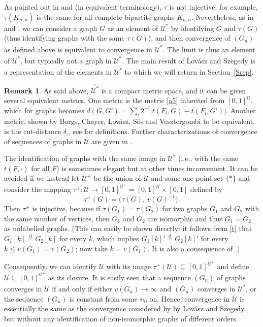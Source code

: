 \documentclass[11pt,reqno,tbtags]{amsart}
\numberwithin{equation}{section}
\theoremstyle{definition}
\newtheorem{remark}{Remark}[section]
\theoremstyle{remark}
\newcommand{\refS}[1]{Section~\ref{#1}}
\newcommand\set[1]{\ensuremath{\{#1\}}}
\newcommand\bigpar[1]{\bigl(#1\bigr)}
\newcommand\ie{i.e.\spacefactor=1000}
\newcommand\eqd{\overset{\mathrm{d}}{=}}
\newcommand\gd{\delta}
\newcommand\cU{{\mathcal U}}
\newcommand\qw{^{-1}}
\renewcommand{\=}{:=}
\newcommand\oi{[0,1]}
\newcommand{\Lovaszetal}{Lov\'asz and Szegedy}
\newcommand{\Borgsetal}{Borgs, Chayes, Lov\'asz, S\'os and Vesztergombi}
\newcommand{\cux}{\cU^*}
\newcommand{\cuxq}{\overline{\cux}}
\newcommand{\cuq}{\overline{\cU}}
\newcommand{\cuu}{\cU^+}
\newcommand{\oiu}{\oi^{\cU}}
\newcommand{\oiuu}{\oi^{\cuu}}
\newcommand{\tauu}{\tau^+}
\newcommand{\dcut}{\gd_\square}
\begin{document}
As pointed out in \cite{LSz} and \cite{BCL1} (in equivalent terminology),
$\tau$ is not injective; for example, $\tau(K_{n,n})$ is the same for
all complete bipartite graphs $K_{n,n}$. 
Nevertheless,
as in \cite{LSz} and \cite{BCL1}, we can
consider a graph $G$ as an element of $\cux$ by identifying $G$ and
$\tau(G)$ (thus identifying graphs with the same $\tau(G)$), and then
convergence of $(G_n)$ as defined above is equivalent to convergence
in $\cuxq$. The limit is thus an element of $\cuxq$, but typically not
a graph in $\cux$.
The main result of \Lovaszetal{} \cite{LSz} is a representation of
the elements in $\cuxq$ to which we will return in \refS{Srep}.

\begin{remark}\label{Rmetric1}
  As said above, $\cuxq$ is a compact metric space, and it can be
  given several equivalent metrics.
One metric is the metric \eqref{a5} inherited from $\oiu$, which for 
graphs becomes 
$d(G,G')=\sum_i 2^{-i}|t(F_i,G)-t(F_i,G')|$.
Another metric, shown by
\Borgsetal{} \cite{BCL1} to be equivalent, 
is the cut-distance $\dcut$, see 
\cite{BCL1} for definitions.
Further characterizations of convergence of sequences of graphs in
  $\cuq$ are given in \citet{BCL1,BCL1ii}. 
\end{remark}

The identification of graphs with the same image in $\cux$
(\ie, with the same $t(F,\cdot)$ for all $F$) is sometimes elegant but
at other times inconvenient. It can be avoided if we instead let
$\cuu$ be the union of $\cU$ and some one-point set \set{*} and
consider the mapping $\tauu:\cU\to\oiuu=\oiu\times\oi$ defined by
\begin{equation}\label{tau+}
  \tauu(G)=\bigpar{\tau(G),\,v(G)\qw}.
\end{equation}
Then $\tauu$ is injective, because if $\tau(G_1)=\tau(G_2)$ for two
graphs $G_1$ and $G_2$ with the same number of vertices, then $G_1$
and $G_2$ are isomorphic and thus $G_1=G_2$ as unlabelled graphs.
(This can easily be shown directly: it follows from \eqref{t} that
$G_1[k]\eqd G_2[k]$ for every $k$, which implies $G_1[k]'\eqd G_2[k]'$
for every $k\le v(G_1)=v(G_2)$; now take $k=v(G_1)$.
It is also a consequence of
\cite[Theorem 2.7 and Theorem 2.3 or Lemma 5.1]{BCL1}.)

Consequently, we can identify $\cU$ with its image $\tauu(\cU)\subseteq\oiuu$
and define $\cuq\subseteq\oiuu$ as its closure.
It is easily seen that a sequence $(G_n)$ of graphs converges in
$\cuq$ if and only if either $v(G_n)\to\infty$ and $(G_n)$ converges
in $\cuxq$, or the sequence $(G_n)$ is constant from some $n_0$ on.
Hence, convergence in $\cuq$ is essentially the same as the
convergence considered by by \Lovaszetal{} \cite{LSz}, but without any
identification of non-isomorphic graphs of different orders. 
\end{document}
